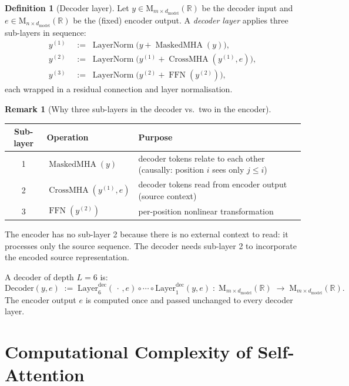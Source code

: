 \documentclass[11pt]{amsart}
\theoremstyle{plain}
\theoremstyle{definition}
\newtheorem{definition}[theorem]{Definition}
\newtheorem{remark}[theorem]{Remark}
\newcommand{\R}{\mathbb{R}}
\newcommand{\Mat}[2]{\mathrm{M}_{#1 \times #2}(\R)}
\newcommand{\MaskedMHA}{\operatorname{MaskedMHA}}
\newcommand{\CrossMHA}{\operatorname{CrossMHA}}
\newcommand{\LayerNorm}{\operatorname{LayerNorm}}
\newcommand{\FFN}{\operatorname{FFN}}
\begin{document}
\begin{definition}[Decoder layer]
\label{def:decoder-layer}
Let $y \in \Mat{m}{d_{\mathrm{model}}}$ be the decoder input and
$e \in \Mat{n}{d_{\mathrm{model}}}$ be the (fixed) encoder output.
A \emph{decoder layer} applies three sub-layers in sequence:
\begin{align*}
    y^{(1)} &\;:=\; \LayerNorm\bigl(y  + \MaskedMHA(y)\bigr),         \\
    y^{(2)} &\;:=\; \LayerNorm\bigl(y^{(1)} + \CrossMHA(y^{(1)},e)\bigr), \\
    y^{(3)} &\;:=\; \LayerNorm\bigl(y^{(2)} + \FFN(y^{(2)})\bigr),
\end{align*}
each wrapped in a residual connection and layer normalisation.
\end{definition}

\begin{remark}[Why three sub-layers in the decoder vs.\ two in the encoder]
\begin{center}
\renewcommand{\arraystretch}{1.3}
\begin{tabular}{clp{5.5cm}}
\hline
Sub-layer & Operation & Purpose \\
\hline
1 & $\MaskedMHA(y)$      & decoder tokens relate to each other (causally: position $i$ sees only $j \leq i$) \\
2 & $\CrossMHA(y^{(1)},e)$ & decoder tokens read from encoder output (source context) \\
3 & $\FFN(y^{(2)})$       & per-position nonlinear transformation \\
\hline
\end{tabular}
\end{center}
The encoder has no sub-layer 2 because there is no external context to read:
it processes only the source sequence.  The decoder needs sub-layer 2 to
incorporate the encoded source representation.
\end{remark}

A decoder of depth $L = 6$ is:
\[
    \mathrm{Decoder}(y, e)
    \;:=\; \mathrm{Layer}^{\mathrm{dec}}_6(\,\cdot\,,e)
           \circ \cdots \circ
           \mathrm{Layer}^{\mathrm{dec}}_1(y, e)
    \;:\; \Mat{m}{d_{\mathrm{model}}} \;\to\; \Mat{m}{d_{\mathrm{model}}}.
\]
The encoder output $e$ is computed once and passed unchanged to every decoder
layer.

\section{Computational Complexity of Self-Attention}
\label{sec:complexity}
\end{document}

